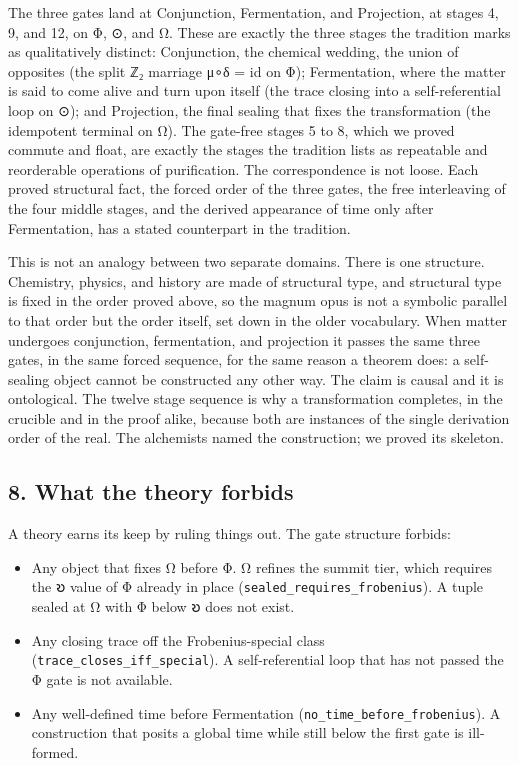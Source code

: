 The three gates land at Conjunction, Fermentation, and Projection, at
stages 4, 9, and 12, on Φ, ⊙, and Ω. These are exactly the three stages
the tradition marks as qualitatively distinct: Conjunction, the chemical
wedding, the union of opposites (the split ℤ₂ marriage μ∘δ = id on Φ);
Fermentation, where the matter is said to come alive and turn upon
itself (the trace closing into a self-referential loop on ⊙); and
Projection, the final sealing that fixes the transformation (the
idempotent terminal on Ω). The gate-free stages 5 to 8, which we proved
commute and float, are exactly the stages the tradition lists as
repeatable and reorderable operations of purification. The
correspondence is not loose. Each proved structural fact, the forced
order of the three gates, the free interleaving of the four middle
stages, and the derived appearance of time only after Fermentation, has
a stated counterpart in the tradition.

This is not an analogy between two separate domains. There is one
structure. Chemistry, physics, and history are made of structural type,
and structural type is fixed in the order proved above, so the magnum
opus is not a symbolic parallel to that order but the order itself, set
down in the older vocabulary. When matter undergoes conjunction,
fermentation, and projection it passes the same three gates, in the same
forced sequence, for the same reason a theorem does: a self-sealing
object cannot be constructed any other way. The claim is causal and it
is ontological. The twelve stage sequence is why a transformation
completes, in the crucible and in the proof alike, because both are
instances of the single derivation order of the real. The alchemists
named the construction; we proved its skeleton.

\hypertarget{what-the-theory-forbids}{%
\subsection{8. What the theory forbids}\label{what-the-theory-forbids}}

A theory earns its keep by ruling things out. The gate structure
forbids:

\begin{itemize}
\tightlist
\item
  Any object that fixes Ω before Φ. Ω refines the summit tier, which
  requires the 𐑹 value of Φ already in place
  (\texttt{sealed\_requires\_frobenius}). A tuple sealed at Ω with Φ
  below 𐑹 does not exist.
\item
  Any closing trace off the Frobenius-special class
  (\texttt{trace\_closes\_iff\_special}). A self-referential loop that
  has not passed the Φ gate is not available.
\item
  Any well-defined time before Fermentation
  (\texttt{no\_time\_before\_frobenius}). A construction that posits a
  global time while still below the first gate is ill-formed.
\end{itemize}

